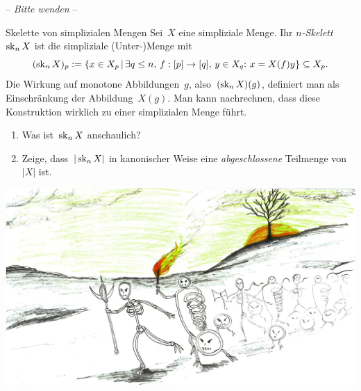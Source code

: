 \documentclass{uebblatt}
\begin{document}
\begin{center}-- \emph{Bitte wenden} --\end{center}

\newpage

\begin{aufgabe}{Skelette von simplizialen Mengen}
Sei~$X$ eine simpliziale Menge. Ihr \emph{$n$-Skelett}~$\operatorname{sk}_n X$ ist die
simpliziale (Unter-)Menge mit
\[ (\sk_n X)_p := \{ x \in X_p \,|\,
  \exists q \leq n,\, f : [p] \to [q],\, y \in X_q{:}\ 
  x = X(f)y \} \subseteq X_p. \]
Die Wirkung auf monotone Abbildungen~$g$, also~$(\operatorname{sk}_n X)(g)$, definiert man als
Einschränkung der Abbildung~$X(g)$. Man kann nachrechnen, dass diese
Konstruktion wirklich zu einer simplizialen Menge führt.

\begin{enumerate}
\item Was ist~$\operatorname{sk}_n X$ anschaulich?
\item Zeige, dass~$|\operatorname{sk}_n X|$ in kanonischer Weise eine \emph{abgeschlossene}
Teilmenge von~$|X|$ ist.
\end{enumerate}
\end{aufgabe}

\begin{center}
  \includegraphics{knotenarmee}
\end{center}
\end{document}
